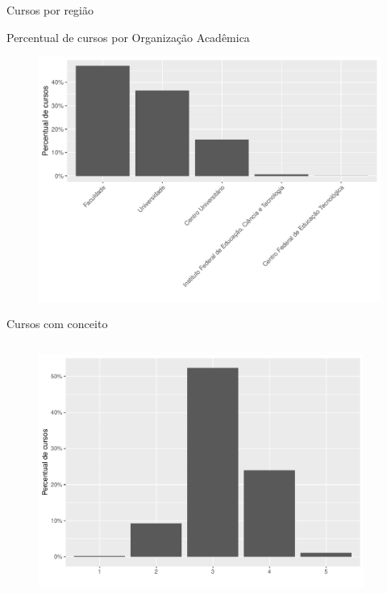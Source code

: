 \documentclass{beamer}
\begin{document}
	\begin{frame}{Cursos por região}
		
	\end{frame}

	\begin{frame}{Percentual de cursos por Organização Acadêmica}
		\begin{figure}[H]
			\includegraphics[scale=.50]{../graficos/latex-graph-percent-de-cursos-p-org-acad.pdf}
		\end{figure}
	\end{frame}

	\begin{frame}{Cursos com conceito}
		\begin{columns}
			\begin{column}{0.5\textwidth}
			   	 	\begin{figure}[H]
					\includegraphics[scale=.3]{../graficos/latex-graph-cursos-com-conceito.pdf}
					\end{figure}
			\end{column}
			\begin{column}{0.5\textwidth}  %
				\centering
			    
			\end{column}
		\end{columns}

	\end{frame}
\end{document}

